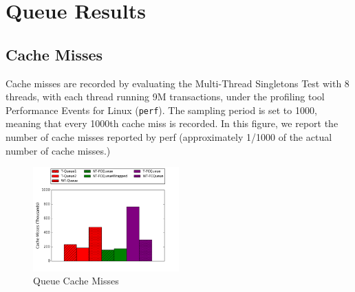 \chapter{Queue Results}
\label{app:queue}

\section{Cache Misses}

Cache misses are recorded by evaluating the Multi-Thread Singletons Test with 8 threads, with each thread running 9M transactions, under the profiling tool Performance Events for Linux (\texttt{perf}). The sampling period is set to 1000, meaning that every 1000th cache miss is recorded.
In this figure, we report the number of cache misses reported by perf (approximately 1/1000 of the actual number of cache misses.)

\begin{figure}[H]
    \centering
    \includegraphics[width=0.5\textwidth]{fcqueues/cm.png}
    \caption{Queue Cache Misses}
\label{fig:cm_queues}
\end{figure}

